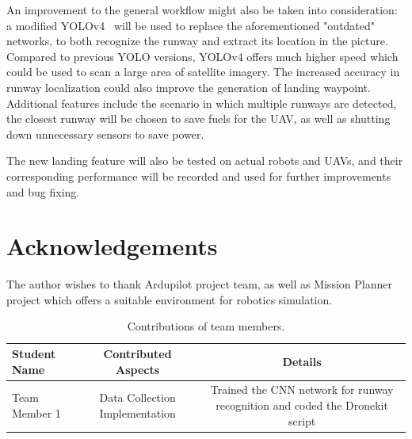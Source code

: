 \documentclass[10pt,twocolumn,letterpaper]{article}
\begin{document}
An improvement to the general workflow might also be taken into consideration: a modified YOLOv4~\cite{Author11} will be used to replace the aforementioned "outdated" networks, to both recognize the runway and extract its location in the picture. Compared to previous YOLO versions, YOLOv4 offers much higher speed which could be used to scan a large area of satellite imagery. The increased accuracy in runway localization could also improve the generation of landing waypoint. Additional features include the scenario in which multiple runways are detected, the closest runway will be chosen to save fuels for the UAV, as well as shutting down unnecessary sensors to save power.

The new landing feature will also be tested on actual robots and UAVs, and their corresponding performance will be recorded and used for further improvements and bug fixing.
\section{Acknowledgements}
The author wishes to thank Ardupilot project team, as well as Mission Planner project which offers a suitable environment for robotics simulation.

\begin{table}
\begin{center}
\begin{tabular}{|l|c|c|}
\hline
Student Name & Contributed Aspects & Details \\
\hline\hline
Team Member 1 & Data Collection Implementation & Trained the CNN network for runway recognition and coded the Dronekit script \\
\hline
\end{tabular}
\end{center}
\caption{Contributions of team members.}
\label{tab:contributions}
\end{table}

{\small


}
\end{document}
